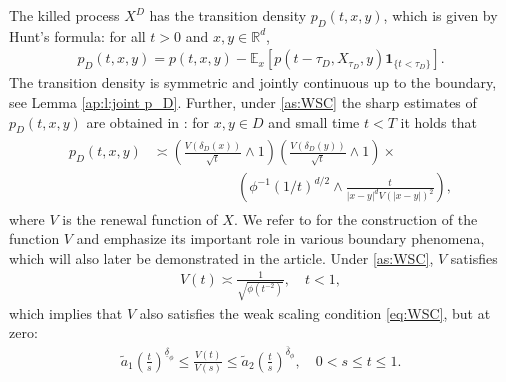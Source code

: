 \documentclass[12pt,a4paper,onecolumn]{article}
\theoremstyle{definition}
\newcommand{\R}{\mathbb{R}}
\newcommand{\ex}{\mathds{E}}
\newcommand{\1}{\mathbf 1}
\newcommand{\de}{\delta_D}
\newcommand{\wt}{\widetilde}
\newcommand{\ud}[1]{\underline{\delta}_{#1}}
\newcommand{\od}[1]{\overline{\delta}_{#1}}
\numberwithin{equation}{section}
\begin{document}
        The killed process $X^D$ has the transition density $p_D(t,x,y)$, which is given by Hunt's formula: for all $t>0$ and $x,y\in \R^d$,
	\begin{align}\label{eq:p_D Hunt}
		p_D(t,x,y)=p(t,x,y)-\ex_x[p(t-\tau_D,X_{\tau_D},y)\1_{\{t<\tau_D\}}].
	\end{align}
        The transition density is symmetric and jointly continuous up to the boundary, see Lemma \ref{ap:l:joint p_D}. Further, under \ref{as:WSC} the sharp estimates of  $p_D(t,x,y)$ are obtained in
	\cite{KM-ejp18-heatkerneldomain}:  for $x,y\in D$  and small time $t<T$
	it holds that
	\begin{align}\label{eq:heat-sharp-small}
		\begin{split}
			p_D(t,x,y)&\asymp \left(\frac{V(\de(x))}{\sqrt{t}}\wedge
			1\right)\left(\frac{V(\de(y))}{\sqrt{t}}\wedge
			1\right)\times\\
			&\hspace{6em}\left({\phi^{-1}(1/t)^{d/2}}\wedge
			\frac{t}{|x-y|^{d}V(|x-y|)^2}\right),
		\end{split}
	\end{align}
	where $V$ is the renewal function of $X$. We refer to \cite[Subsection 4.1]{BVW-na21} for the construction of the function $V$ and emphasize its important role in various boundary phenomena, which will also later be demonstrated in the article. Under \ref{as:WSC}, $V$ satisfies
    \begin{align*}
	    V(t)\asymp \frac{1}{\sqrt{\phi(t^{-2})}},\quad t<1,
    \end{align*}
    which implies that $V$ also satisfies the weak scaling condition \eqref{eq:WSC}, but at zero:
    \begin{align}\label{e:wsc-V}
    	\wt{a}_1 \left(\frac{t}{s}\right)^{\ud{\phi}} \le \frac{V(t)}{V(s)} \le \wt{a}_2 \left(\frac{t}{s}\right)^{\od{\phi}} , \quad 0<s\le t\le 1.
    \end{align}
    
\end{document}
